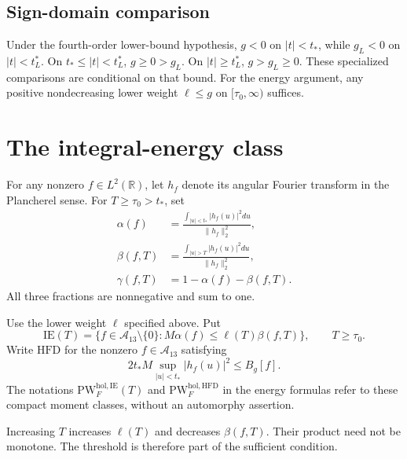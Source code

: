 \subsection{Sign-domain comparison}
\label{v4-arith:w7-e:sign-domain}
Under the fourth-order lower-bound hypothesis, $g<0$ on
$|t|<t_*$, while $g_L<0$ on $|t|<t_L^*$.
On $t_*\le|t|<t_L^*$, $g\ge0>g_L$.
On $|t|\ge t_L^*$, $g>g_L\ge0$.
These specialized comparisons are conditional on that bound.
For the energy argument, any positive nondecreasing lower weight
$\ell\le g$ on $[\tau_0,\infty)$ suffices.

\section{The integral-energy class}
\label{v4-arith:w7-e:integral-energy}
\label{v4-arith:w7-e:energy-fractions}
\begin{definition}
\label{v4-arith:w7-e:def:energy-fractions}
For any nonzero $f\in L^2(\mathbb R)$, let $h_f$ denote its angular Fourier transform in the Plancherel sense. For $T\ge\tau_0>t_*$, set
\begin{align}
\label{v4-arith:w7-e:eq:alpha-core}
 \alpha(f)&=\frac{\int_{|u|<t_*}|h_f(u)|^2du}{\|h_f\|_2^2},\\
\label{v4-arith:w7-e:eq:beta-far}
 \beta(f,T)&=\frac{\int_{|u|>T}|h_f(u)|^2du}{\|h_f\|_2^2},\\
\label{v4-arith:w7-e:eq:gamma-mid}
 \gamma(f,T)&=1-\alpha(f)-\beta(f,T).
\end{align}
All three fractions are nonnegative and sum to one.
\end{definition}
\label{v4-arith:w7-e:IE-definition}
\begin{definition}
\label{v4-arith:w7-e:def:IE-subclass}
Use the lower weight $\ell$ specified above. Put
\begin{equation}
\label{v4-arith:w7-e:eq:IE-condition}
 \mathrm{IE}(T)=\{f\in\mathscr A_{13}\setminus\{0\}:
                        M\alpha(f)\le\ell(T)\beta(f,T)\},\qquad T\ge \tau_0.
\end{equation}
Write $\mathrm{HFD}$ for the nonzero $f\in\mathscr A_{13}$ satisfying
\[
 2t_*M\sup_{|u|<t_*}|h_f(u)|^2\le B_g[f].
\]
The notations $\mathrm{PW}^{\mathrm{hol},\mathrm{IE}}_F(T)$ and
$\mathrm{PW}^{\mathrm{hol},\mathrm{HFD}}_F$ in the energy formulas
refer to these compact moment classes, without an automorphy assertion.
\end{definition}
\begin{remark}
\label{v4-arith:w7-e:rem:monotonicity-T1}
Increasing $T$ increases $\ell(T)$ and decreases $\beta(f,T)$.
Their product need not be monotone. The threshold is therefore part
of the sufficient condition.
\end{remark}

